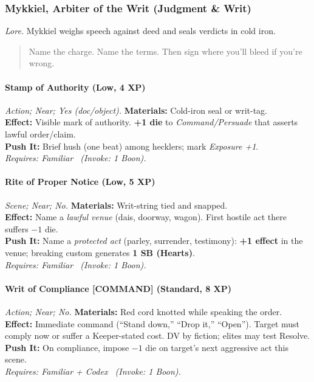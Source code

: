 \subsubsection{Mykkiel, Arbiter of the Writ (Judgment \& Writ)}
\textit{Lore.} Mykkiel weighs speech against deed and seals verdicts in cold iron.

\begin{quote}
Name the charge. Name the terms. Then sign where you’ll bleed if you’re wrong.
\end{quote}

\paragraph{Stamp of Authority (Low, 4 XP)} \emph{Action; Near; Yes (doc/object).}
\textbf{Materials:} Cold-iron seal or writ-tag.\\
\textbf{Effect:} Visible mark of authority. \textbf{+1 die} to \emph{Command/Persuade} that asserts lawful order/claim.\\
\textbf{Push It:} Brief hush (one beat) among hecklers; mark \emph{Exposure +1}.\\
\emph{Requires: Familiar \ (\textit{Invoke:} 1 Boon).}

\paragraph{Rite of Proper Notice (Low, 5 XP)} \emph{Scene; Near; No.}
\textbf{Materials:} Writ-string tied and snapped.\\
\textbf{Effect:} Name a \emph{lawful venue} (dais, doorway, wagon). First hostile act there suffers \(-1\) die.\\
\textbf{Push It:} Name a \emph{protected act} (parley, surrender, testimony): \textbf{+1 effect} in the venue; breaking custom generates \textbf{1 SB (Hearts)}.\\
\emph{Requires: Familiar \ (\textit{Invoke:} 1 Boon).}

\paragraph{Writ of Compliance \textnormal{[COMMAND]} (Standard, 8 XP)} \emph{Action; Near; No.}
\textbf{Materials:} Red cord knotted while speaking the order.\\
\textbf{Effect:} Immediate command (“Stand down,” “Drop it,” “Open”). Target must comply now or suffer a Keeper-stated cost. DV by fiction; elites may test Resolve.\\
\textbf{Push It:} On compliance, impose \(-1\) die on target’s next aggressive act this scene.\\
\emph{Requires: Familiar + Codex \ (\textit{Invoke:} 1 Boon).}

